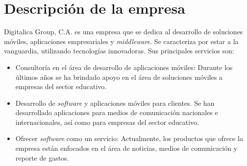 \section{Descripción de la empresa} \label{Descripcion de la empresa}

Digitalica Group, C.A. es una empresa que se dedica al desarrollo de soluciones móviles, aplicaciones empresariales y \textit{middleware}. Se caracteriza por estar a la vanguardia, utilizando tecnologías innovadoras\cite{DIG1}. Sus principales servicios son:

\begin{itemize}
\item Consultoría en el área de desarrollo de aplicaciones móviles: Durante los últimos años se ha brindado apoyo en el área de soluciones móviles a empresas del sector educativo.
\item Desarrollo de \textit{software} y aplicaciones móviles para clientes. Se han desarrollado aplicaciones para medios de comunicación nacionales e internacionales, así como para empresas del sector educativo.
\item Ofrecer \textit{software} como un servicio: Actualmente, los productos que ofrece la empresa están enfocados en el área de noticias, medios de comunicación y reporte de gastos. 
\end{itemize}
